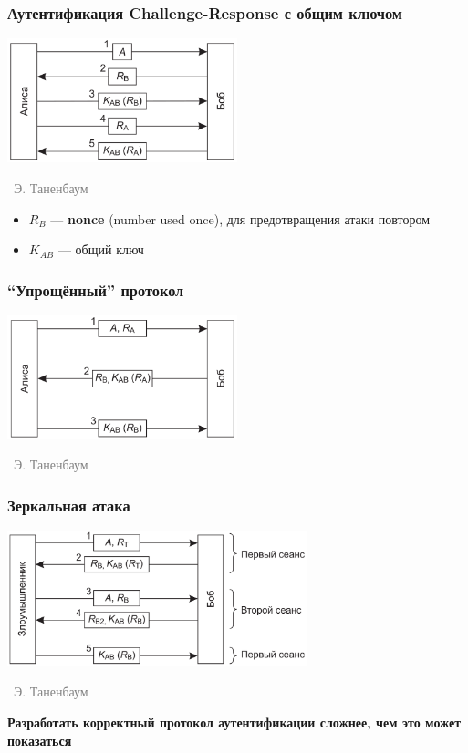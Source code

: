 \documentclass[xetex,mathserif,serif]{beamer}
\newcommand{\attribution}[1] {
\vspace{-5mm}\begin{flushright}\begin{scriptsize}\textcolor{gray}{\textcopyright\, #1}\end{scriptsize}\end{flushright}
}
\begin{document}
	\begin{frame}
		\frametitle{Аутентификация Challenge-Response с общим ключом}
		\begin{center}
			\includegraphics[width=0.5\textwidth]{challengeResponse.png}
			\attribution{Э. Таненбаум}
		\end{center}
		\begin{itemize}
			\item $R_B$ --- \textbf{nonce} (number used once), для предотвращения атаки повтором
			\item $K_{AB}$ --- общий ключ
		\end{itemize}
	\end{frame}

	\begin{frame}
		\frametitle{``Упрощённый'' протокол}
		\begin{center}
			\includegraphics[width=0.5\textwidth]{simpleChallengeResponse.png}
			\attribution{Э. Таненбаум}
		\end{center}
	\end{frame}

	\begin{frame}
		\frametitle{Зеркальная атака}
		\begin{center}
			\includegraphics[width=0.65\textwidth]{mirrorAttack.png}
			\attribution{Э. Таненбаум}
		\end{center}
		\vspace{5mm}
		\textbf{Разработать корректный протокол аутентификации сложнее, чем это может показаться}
	\end{frame}
\end{document}
